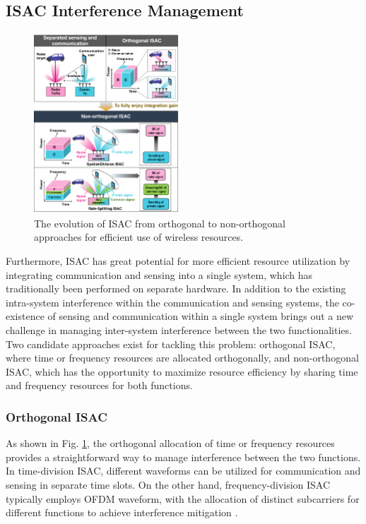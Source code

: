 \documentclass[journal, comsoc]{IEEEtran}
\begin{document}
\subsection{ISAC Interference Management}

\begin{figure}[t!]
    \centering
    \includegraphics[width=0.49\textwidth]{Figures/Fig_Interference_management.pdf}
    \caption{The evolution of ISAC from orthogonal to non-orthogonal approaches for efficient use of wireless resources.}%
    \label{Fig_Interference_management}
\end{figure}

Furthermore, ISAC has great potential for more efficient resource utilization by integrating communication and sensing into a single system, which has traditionally been performed on separate hardware. In addition to the existing intra-system interference within the communication and sensing systems, the co-existence of sensing and communication within a single system brings out a new challenge in managing inter-system interference between the two functionalities. Two candidate approaches exist for tackling this problem: orthogonal ISAC, where time or frequency resources are allocated orthogonally, and non-orthogonal ISAC, which has the opportunity to maximize resource efficiency by sharing time and frequency resources for both functions.
\subsubsection{Orthogonal ISAC}
As shown in Fig. \ref{Fig_Interference_management}, the orthogonal allocation of time or frequency resources provides a straightforward way to manage interference between the two functions.  In time-division ISAC, different waveforms can be utilized for communication and sensing in separate time slots. On the other hand, frequency-division ISAC typically employs OFDM waveform, with the allocation of distinct subcarriers for different functions to achieve interference mitigation \cite{liu2022integrated}.
\end{document}
